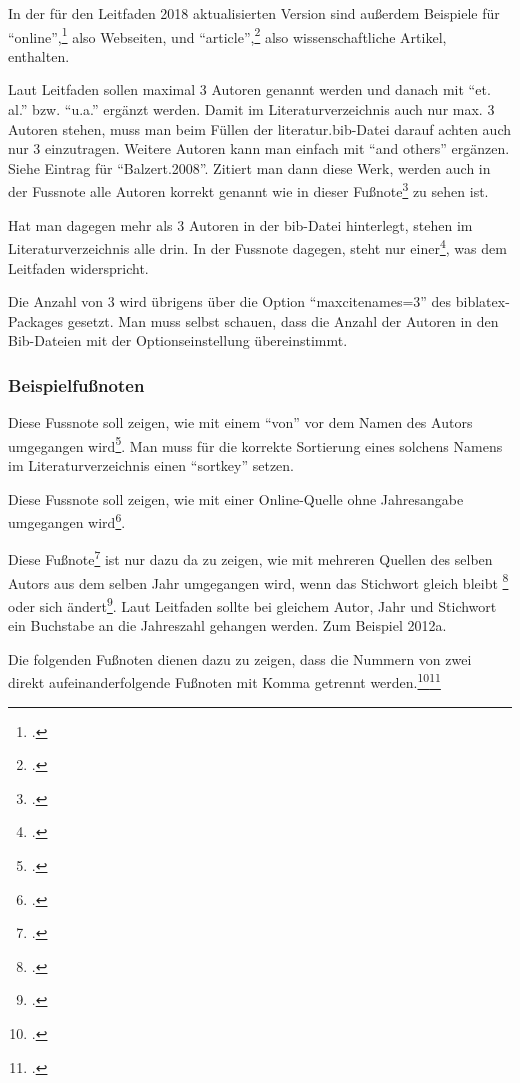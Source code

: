 In der für den Leitfaden 2018 aktualisierten Version sind außerdem Beispiele für \enquote{online},\footcite[Vgl.][]{website:angular:aboutAngular} also Webseiten, und \enquote{article},\footcite[Vgl.][S. 140]{Decker2009} also wissenschaftliche Artikel, enthalten.

Laut Leitfaden sollen maximal 3 Autoren genannt werden und danach mit
\enquote{et. al.} bzw. \enquote{u.a.} ergänzt werden. Damit im Literaturverzeichnis auch nur max.
3 Autoren stehen, muss man beim Füllen der literatur.bib-Datei darauf achten auch nur 3
einzutragen. Weitere Autoren kann man einfach mit \enquote{and others} ergänzen.
Siehe Eintrag für \enquote{Balzert.2008}. Zitiert man dann diese Werk, werden auch in
der Fussnote alle Autoren korrekt genannt wie in dieser
Fußnote\footcite[Vgl.][S. 1]{Balzert.2008} zu sehen ist.

Hat man dagegen mehr als 3 Autoren in der bib-Datei hinterlegt, stehen im
Literaturverzeichnis alle drin. In der Fussnote dagegen, steht nur
einer\footcite[Vgl.][S. 1]{Balzert2.2008}, was dem Leitfaden widerspricht.

Die Anzahl von 3 wird übrigens über die Option \enquote{maxcitenames=3} des
biblatex-Packages gesetzt. Man muss selbst schauen, dass die Anzahl der Autoren
in den Bib-Dateien mit der Optionseinstellung übereinstimmt.

\subsubsection{Beispielfußnoten}
Diese Fussnote soll zeigen, wie mit einem \enquote{von} vor dem Namen des Autors
umgegangen wird\footcite[Vgl.][S. 1]{Lucke2018}. Man muss für die korrekte
Sortierung eines solchens Namens im Literaturverzeichnis einen \enquote{sortkey}
setzen.

Diese Fussnote soll zeigen, wie mit einer Online-Quelle ohne Jahresangabe
umgegangen wird\footcite[Vgl.][]{Belastingdienst}.

Diese Fußnote\footcite[Vgl.][S.1]{Beckert.2012} ist nur dazu da zu zeigen, wie mit mehreren Quellen des selben Autors aus dem selben Jahr umgegangen wird, wenn das Stichwort gleich bleibt \footcite[Vgl.][S.2]{Beckert.2012.1} oder sich ändert\footcite[Vgl.][S.3]{Beckert.2012.2}. Laut Leitfaden sollte bei gleichem Autor, Jahr und Stichwort ein Buchstabe an die Jahreszahl gehangen werden. Zum Beispiel 2012a. 

Die folgenden Fußnoten dienen dazu zu zeigen, dass die Nummern von zwei direkt aufeinanderfolgende Fußnoten mit Komma getrennt werden.\footcite[Vgl.][S.2]{Beckert.2012.1}\footcite[Vgl.][S. 1]{Lucke2018}
